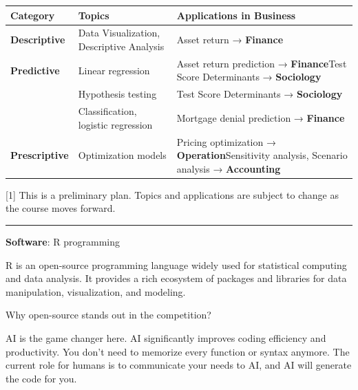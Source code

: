 \documentclass[
  12pt,
  letterpaper,
]{scrbook}
\theoremstyle{plain}
\theoremstyle{definition}
\theoremstyle{remark}
\begin{document}
\begin{longtable}[]{@{}
  >{\raggedright\arraybackslash}p{}
  >{\raggedright\arraybackslash}p{}
  >{\raggedright\arraybackslash}p{}@{}}
\toprule\noalign{}
\begin{minipage}[b]{\linewidth}\raggedright
\textbf{Category}
\end{minipage} & \begin{minipage}[b]{\linewidth}\raggedright
\textbf{Topics}
\end{minipage} & \begin{minipage}[b]{\linewidth}\raggedright
\textbf{Applications in Business}
\end{minipage} \\
\midrule\noalign{}
\endhead
\bottomrule\noalign{}
\endlastfoot
\textbf{Descriptive} & Data Visualization, Descriptive Analysis & Asset
return → \textbf{Finance} \\
\textbf{Predictive} & Linear regression & Asset return prediction →
\textbf{Finance}Test Score Determinants → \textbf{Sociology} \\
& Hypothesis testing & Test Score Determinants → \textbf{Sociology} \\
& Classification, logistic regression & Mortgage denial prediction →
\textbf{Finance} \\
\textbf{Prescriptive} & Optimization models & Pricing optimization →
\textbf{Operation}Sensitivity analysis, Scenario analysis →
\textbf{Accounting} \\
\end{longtable}

{[}1{]} This is a preliminary plan. Topics and applications are subject
to change as the course moves forward.

\begin{center}\rule{0.5\linewidth}{0.5pt}\end{center}

\textbf{Software}: R programming

R is an open-source programming language widely used for statistical
computing and data analysis. It provides a rich ecosystem of packages
and libraries for data manipulation, visualization, and modeling.

Why open-source stands out in the competition?

AI is the game changer here. AI significantly improves coding efficiency
and productivity. You don't need to memorize every function or syntax
anymore. The current role for humans is to communicate your needs to AI,
and AI will generate the code for you.
\end{document}

